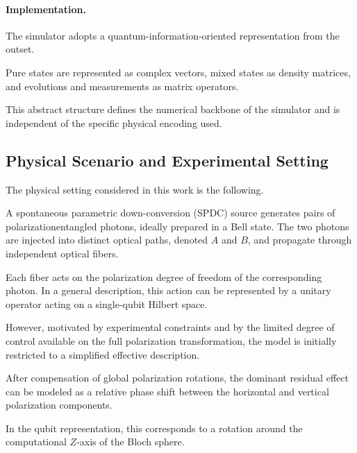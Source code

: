 \documentclass[a4paper]{article}
\begin{document}
\paragraph{Implementation.}

The simulator adopts a quantum-information-oriented representation from the outset.

Pure states are represented as complex vectors, mixed states as density matrices, and evolutions and measurements as matrix operators.

This abstract structure defines the numerical backbone of the simulator and is independent of the specific physical encoding used.


\subsection{Physical Scenario and Experimental Setting}

The physical setting considered in this work is the following.

A spontaneous parametric down-conversion (SPDC) source generates pairs of
polarization\-entangled photons, ideally prepared in a Bell state. The two photons
are injected into distinct optical paths, denoted \(A\) and \(B\), and propagate
through independent optical fibers.

\medskip

Each fiber acts on the polarization degree of freedom of the corresponding photon. In a general description, this action can be represented by a unitary operator acting on a single-qubit Hilbert space.

However, motivated by experimental constraints and by the limited degree of control available on the full polarization transformation, the model is initially restricted to a simplified effective description.

\medskip

After compensation of global polarization rotations, the dominant residual effect can be modeled as a relative phase shift between the horizontal and vertical polarization components.

In the qubit representation, this corresponds to a rotation around the computational \( Z \)-axis of the Bloch sphere.

\medskip
\end{document}
